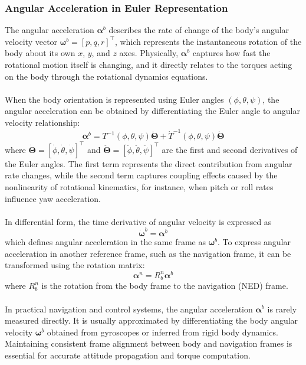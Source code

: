 \subsubsection{Angular Acceleration in Euler Representation}
The angular acceleration $\boldsymbol{\alpha}^b$ describes the rate of change of the body's angular velocity vector $\boldsymbol{\omega}^b = [p, q, r]^\top$, which represents the instantaneous rotation of the body about its own $x$, $y$, and $z$ axes. Physically, $\boldsymbol{\alpha}^b$ captures how fast the rotational motion itself is changing, and it directly relates to the torques acting on the body through the rotational dynamics equations.  
\\ \\
When the body orientation is represented using Euler angles $(\phi, \theta, \psi)$, the angular acceleration can be obtained by differentiating the Euler angle to angular velocity relationship:
$$
    \boldsymbol{\alpha}^b = T^{-1}(\phi, \theta, \psi)\ddot{\boldsymbol{\Theta}} + \dot{T}^{-1}(\phi, \theta, \psi)\dot{\boldsymbol{\Theta}}
$$
where $\dot{\boldsymbol{\Theta}} = [\dot{\phi}, \dot{\theta}, \dot{\psi}]^\top$ and $\ddot{\boldsymbol{\Theta}} = [\ddot{\phi}, \ddot{\theta}, \ddot{\psi}]^\top$ are the first and second derivatives of the Euler angles. The first term represents the direct contribution from angular rate changes, while the second term captures coupling effects caused by the nonlinearity of rotational kinematics, for instance, when pitch or roll rates influence yaw acceleration.  
\\ \\
In differential form, the time derivative of angular velocity is expressed as
$$
    \dot{\boldsymbol{\omega}}^b = \boldsymbol{\alpha}^b
$$
which defines angular acceleration in the same frame as $\boldsymbol{\omega}^b$. To express angular acceleration in another reference frame, such as the navigation frame, it can be transformed using the rotation matrix:
$$
    \boldsymbol{\alpha}^n = R_b^n \boldsymbol{\alpha}^b
$$
where $R_b^n$ is the rotation from the body frame to the navigation (NED) frame.  
\\ \\
In practical navigation and control systems, the angular acceleration $\boldsymbol{\alpha}^b$ is rarely measured directly. It is usually approximated by differentiating the body angular velocity $\boldsymbol{\omega}^b$ obtained from gyroscopes or inferred from rigid body dynamics. Maintaining consistent frame alignment between body and navigation frames is essential for accurate attitude propagation and torque computation.




